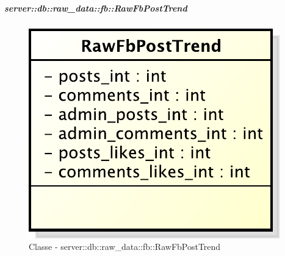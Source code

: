 			\subparagraph{server::db::raw\_data::fb::RawFbPostTrend} %
			\label{subp:server_db_raw_data_fb_RawFbPostTrend}
				\begin{figure}[htbp]
					\centering
					\centerline{\includegraphics[scale=0.75]{./images/server/classes/db/raw_fb_post_trend.pdf}}
					\caption{Classe - server::db::raw\_data::fb::RawFbPostTrend}
				\end{figure}
